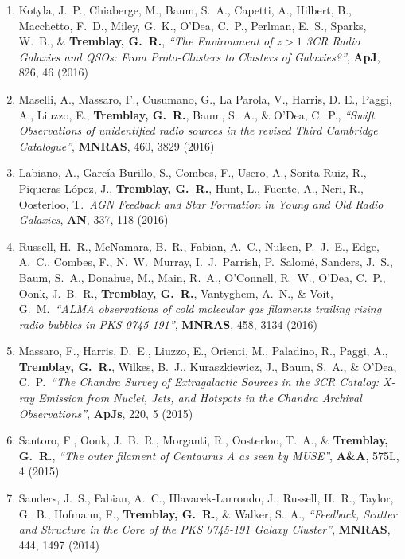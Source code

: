 \documentclass[11pt]{article}
\begin{document}
\begin{enumerate}[resume]
\item Kotyla, J.~P., Chiaberge, M., Baum, S.~A., Capetti, A., Hilbert, B., Macchetto, F.~D., Miley, G.~K., O'Dea, C.~P., Perlman, E.~S., Sparks, W.~B., \& \textbf{Tremblay, G.~R.}, \textit{``The Environment of $z>1$ 3CR Radio Galaxies and QSOs: From Proto-Clusters to Clusters of Galaxies?''}, \textbf{ApJ}, 826, 46 (2016)


\item Maselli, A., Massaro, F., Cusumano, G., La Parola, V., Harris, D. E., Paggi, A., Liuzzo, E., \textbf{Tremblay, G.~R.},
Baum, S.~A., \& O'Dea, C.~P., \textit{``Swift Observations of unidentified radio sources in the revised Third Cambridge Catalogue''}, \textbf{MNRAS}, 460, 3829 (2016)

\item Labiano, A., Garc\'{i}a-Burillo, S., Combes, F., Usero, A., Sorita-Ruiz, R., Piqueras L\'{o}pez, J., \textbf{Tremblay, G.~R.}, Hunt, L., Fuente, A., Neri, R.,
Oosterloo, T.\ \textit{AGN Feedback and Star Formation in Young and Old Radio Galaxies}, \textbf{AN}, 337, 118 (2016)

\item Russell, H.~R., McNamara, B.~R., Fabian, A.~C., Nulsen, P.~J.~E., Edge, A.~C., Combes, F., N.~W.~Murray, I.~J.~Parrish, P.~Salom\'{e}, Sanders, J.~S., Baum, S.~A., Donahue, M., Main, R.~A.,
O'Connell, R.~W., O'Dea, C.~P., Oonk, J.~B.~R., \textbf{Tremblay, G.~R.}, Vantyghem, A.~N., \& Voit, G.~M.\ \textit{``ALMA observations of cold molecular gas filaments trailing rising radio bubbles in PKS 0745-191''}, \textbf{MNRAS}, 458, 3134 (2016)


\item Massaro, F., Harris, D.~E., Liuzzo, E., Orienti, M., Paladino, R., Paggi, A., \textbf{Tremblay, G.~R.}, Wilkes, B.~J., Kuraszkiewicz, J., Baum, S.~A., \& O'Dea, C.~P.\ \textit{``The Chandra Survey of Extragalactic Sources in the 3CR Catalog: X-ray Emission from Nuclei, Jets, and Hotspots in the Chandra Archival Observations''}, \textbf{ApJs}, 220, 5 (2015)


\item Santoro, F., Oonk, J.~B.~R., Morganti, R., Oosterloo, T.~A., \& \textbf{Tremblay, G.~R.},  \textit{``The outer filament of Centaurus A as seen by MUSE''}, \textbf{A\&A}, 575L, 4 (2015)


\item Sanders, J.~S., Fabian, A.~C., Hlavacek-Larrondo, J., Russell, H.~R., Taylor, G.~B., Hofmann, F., \textbf{Tremblay, G.~R.}, \& Walker, S.~A.,  \textit{``Feedback, Scatter and Structure in the Core of the PKS 0745-191 Galaxy Cluster''}, \textbf{MNRAS}, 444, 1497 (2014)



\end{enumerate}
\end{document}
